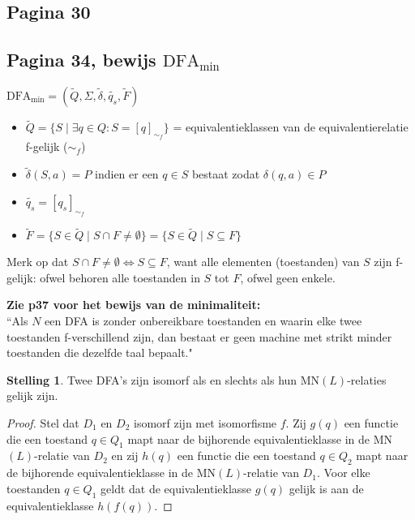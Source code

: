 \documentclass[kulak]{kulakarticle}
\newcommand{\DFA}{\text{DFA}}
\newcommand{\mnl}{MN\((L)\)}
\theoremstyle{definition}
\newtheorem*{stelling}{Stelling}
\begin{document}
	

	\subsection*{Pagina 30}

	

	\newpage
	\subsection*{Pagina 34, bewijs \( \DFA_{\text{min}} \)}

	\(\DFA_{\text{min}} = (\tilde{Q}, \Sigma, \tilde{\delta}, \tilde{q_s}, \tilde{F})\)
	\begin{itemize}
		\item \(\tilde{Q} = \{S \mid \exists q \in Q : S = [q]_{\sim_f}\}\) = equivalentieklassen van de equivalentierelatie f-gelijk (\(\sim_f\))
		\item \(\tilde{\delta}(S, a) = P\) indien er een \(q \in S\) bestaat zodat \( \delta(q,a) \in P\)
		\item \(\tilde{q_s} = [q_s]_{\sim_f}\)
		\item \(\tilde{F} = \{S \in \tilde{Q} \mid S \cap F \neq \emptyset \} = \{S \in \tilde{Q} \mid S \subseteq F\} \)
	\end{itemize}
	Merk op dat \(S \cap F \neq \emptyset \Leftrightarrow S \subseteq F\), want alle elementen (toestanden) van \(S\) zijn f-gelijk: ofwel behoren alle toestanden in \(S\) tot \(F\), ofwel geen enkele.

	

	\textbf{Zie p37 voor het bewijs van de minimaliteit:}\\
	``Als \(N\) een DFA is zonder onbereikbare toestanden en waarin elke twee toestanden f-verschillend zijn, dan bestaat er geen machine
	met strikt minder toestanden die dezelfde taal bepaalt."

	\begin{stelling}
		Twee DFA's zijn isomorf als en slechts als hun \mnl-relaties gelijk zijn.
	\end{stelling}

	\begin{proof}
		Stel dat \(D_1\) en \(D_2\) isomorf zijn met isomorfisme \(f\). Zij \(g(q)\) een functie die een toestand \(q \in Q_1\) mapt naar de bijhorende equivalentieklasse in de \mnl-relatie van \(D_2\) en zij \(h(q)\) een functie die een toestand \(q \in Q_2\) mapt naar de bijhorende equivalentieklasse in de \mnl-relatie van \(D_1\). Voor elke toestanden \(q \in Q_1\) geldt dat de equivalentieklasse \(g(q)\) gelijk is aan de equivalentieklasse \(h(f(q))\).
	\end{proof}
\end{document}
